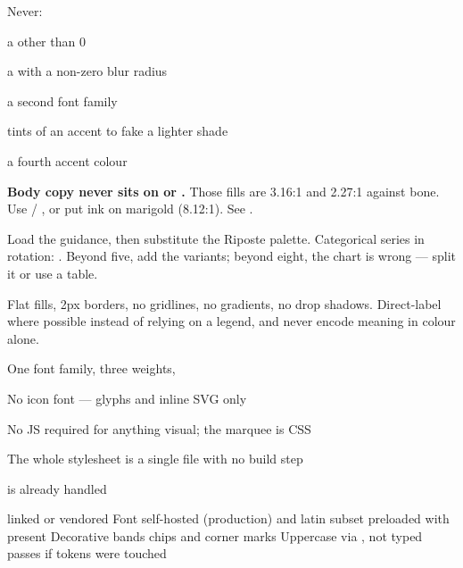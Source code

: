 \documentclass[fontpath=fonts/,logopath=logo/]{riposte-doc}
\begin{document}
Never:

\begin{ripbullets}
\item a  other than 0
\item a  with a non-zero blur radius
\item a second font family
\item {} tints of an accent to fake a lighter shade
\item a fourth accent colour
\end{ripbullets}

\textbf{Body copy never sits on  or .} Those fills are 3.16:1 and 2.27:1 against bone. Use  / , or put ink on marigold (8.12:1). See .



Load the  guidance, then substitute the Riposte palette. Categorical series in rotation: . Beyond five, add the  variants; beyond eight, the chart is wrong — split it or use a table.

Flat fills, 2px borders, no gridlines, no gradients, no drop shadows. Direct-label where possible instead of relying on a legend, and never encode meaning in colour alone.



\begin{ripbullets}
\item One font family, three weights, 
\item No icon font — glyphs and inline SVG only
\item No JS required for anything visual; the marquee is CSS
\item The whole stylesheet is a single file with no build step
\item {} is already handled
\end{ripbullets}



\begin{riptodolist}
\riptodo {} linked or vendored
\riptodo Font self-hosted (production) and latin subset preloaded with 
\riptodo {} present
\riptodo Decorative bands 
\riptodo {} chips and corner marks 
\riptodo Uppercase via , not typed
\riptodo {} passes if tokens were touched
\end{riptodolist}

\ripend
\end{document}
